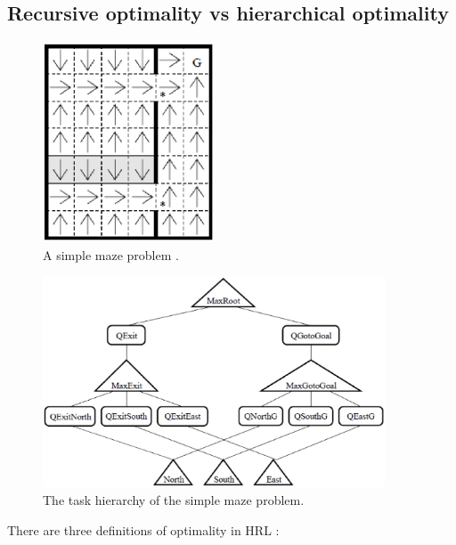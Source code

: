 \subsection{Recursive optimality vs hierarchical optimality}
\label{se:ROHO}
\begin{figure}[t]
\begin{center}
    \includegraphics[width=2in] {./figures/Maze.eps}
\end{center}
\caption{A simple maze problem \cite{MaxQJ}.}
\label{fig:Maze}
\end{figure}
\begin{figure}[t]
\begin{center}
    \includegraphics[width=4in] {./figures/MazeH.eps}
\end{center}
\caption{The task hierarchy of the simple maze problem.}
\label{fig:MazeH}
\end{figure}

There are three definitions of optimality in HRL \cite{MaxQJ}:

